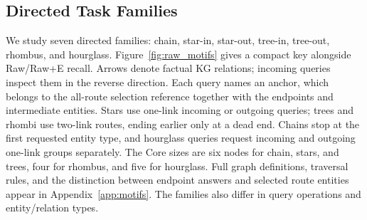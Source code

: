 \subsection{Directed Task Families}
\label{sec:motifs}
We study seven directed families: chain, star-in, star-out, tree-in, tree-out, rhombus, and hourglass. Figure~\ref{fig:raw_motifs} gives a compact key alongside Raw/Raw+E recall. Arrows denote factual KG relations; incoming queries inspect them in the reverse direction. Each query names an anchor, which belongs to the all-route selection reference together with the endpoints and intermediate entities. Stars use one-link incoming or outgoing queries; trees and rhombi use two-link routes, ending earlier only at a dead end. Chains stop at the first requested entity type, and hourglass queries request incoming and outgoing one-link groups separately. The Core sizes are six nodes for chain, stars, and trees, four for rhombus, and five for hourglass. Full graph definitions, traversal rules, and the distinction between endpoint answers and selected route entities appear in Appendix~\ref{app:motifs}. The families also differ in query operations and entity/relation types.
